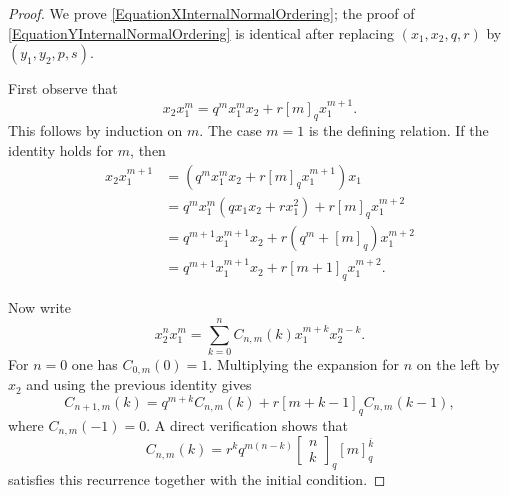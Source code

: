 \documentclass[10pt,a4paper]{amsart}
\begin{document}
\begin{proof}
We prove \eqref{EquationXInternalNormalOrdering}; the proof of \eqref{EquationYInternalNormalOrdering} is identical after replacing $(x_1,x_2,q,r)$ by $(y_1,y_2,p,s)$.

First observe that
\[
x_2x_1^m
=
q^mx_1^mx_2+r[m]_qx_1^{m+1}.
\]
This follows by induction on $m$. The case $m=1$ is the defining relation. If the identity holds for $m$, then
\begin{align*}
x_2x_1^{m+1}
&=
\left(q^mx_1^mx_2+r[m]_qx_1^{m+1}\right)x_1\\
&=
q^mx_1^m(qx_1x_2+rx_1^2)+r[m]_qx_1^{m+2}\\
&=
q^{m+1}x_1^{m+1}x_2+r(q^m+[m]_q)x_1^{m+2}\\
&=
q^{m+1}x_1^{m+1}x_2+r[m+1]_qx_1^{m+2}.
\end{align*}

Now write
\[
x_2^nx_1^m
=
\sum_{k=0}^{n}
C_{n,m}(k)x_1^{m+k}x_2^{n-k}.
\]
For $n=0$ one has $C_{0,m}(0)=1$. Multiplying the expansion for $n$ on the left by $x_2$ and using the previous identity gives
\[
C_{n+1,m}(k)
=
q^{m+k}C_{n,m}(k)
+
r[m+k-1]_qC_{n,m}(k-1),
\]
where $C_{n,m}(-1)=0$. A direct verification shows that
\[
C_{n,m}(k)
=
r^kq^{m(n-k)}
\begin{bmatrix}
n\\
k
\end{bmatrix}_q
[m]_{q}^{\overline{k}}
\]
satisfies this recurrence together with the initial condition.
\end{proof}
\end{document}
